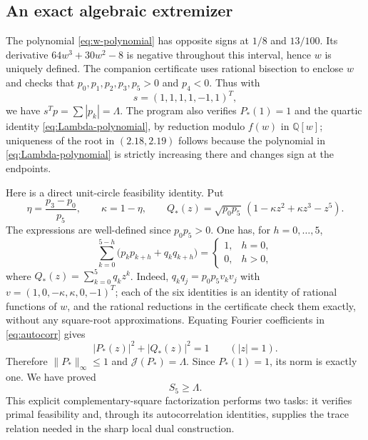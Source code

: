\documentclass[11pt]{article}
\newcommand{\Q}{\mathbb Q}
\newcommand{\J}{\mathcal J}
\begin{document}
\subsection{An exact algebraic extremizer}\label{sec:algebra}

The polynomial \eqref{eq:w-polynomial} has opposite signs at $1/8$ and $13/100$. Its derivative $64w^3+30w^2-8$ is negative throughout this interval, hence $w$ is uniquely defined. The companion certificate uses rational bisection to enclose $w$ and checks that $p_0,p_1,p_2,p_3,p_5>0$ and $p_4<0$. Thus with
\begin{equation}\label{eq:s-vector}
 s=(1,1,1,1,-1,1)^T,
\end{equation}
we have $s^Tp=\sum|p_k|=\Lambda$. The program also verifies $P_*(1)=1$ and the quartic identity \eqref{eq:Lambda-polynomial}, by reduction modulo $f(w)$ in $\Q[w]$; uniqueness of the root in $(2.18,2.19)$ follows because the polynomial in \eqref{eq:Lambda-polynomial} is strictly increasing there and changes sign at the endpoints.

Here is a direct unit-circle feasibility identity. Put
\begin{equation}\label{eq:qcoefficients}
 \eta=\frac{p_3-p_0}{p_5},\qquad \kappa=1-\eta,
 \qquad Q_*(z)=\sqrt{p_0p_5}\,(1-\kappa z^2+\kappa z^3-z^5).
\end{equation}
The expressions are well-defined since $p_0p_5>0$. One has, for $h=0,\ldots,5$,
\begin{equation}\label{eq:autocorr}
 \sum_{k=0}^{5-h}\bigl(p_kp_{k+h}+q_kq_{k+h}\bigr)
 =\begin{cases}1,&h=0,\\0,&h>0,\end{cases}
\end{equation}
where $Q_*(z)=\sum_{k=0}^5q_kz^k$. Indeed, $q_kq_j=p_0p_5v_kv_j$ with $v=(1,0,-\kappa,\kappa,0,-1)^T$; each of the six identities is an identity of rational functions of $w$, and the rational reductions in the certificate check them exactly, without any square-root approximations. Equating Fourier coefficients in \eqref{eq:autocorr} gives
\begin{equation}\label{eq:complement}
 |P_*(z)|^2+|Q_*(z)|^2=1\qquad(|z|=1).
\end{equation}
Therefore $\|P_*\|_\infty\le1$ and $\J(P_*)=\Lambda$. Since $P_*(1)=1$, its norm is exactly one. We have proved
\begin{equation}\label{eq:lowerbound}
 S_5\ge\Lambda.
\end{equation}
This explicit complementary-square factorization performs two tasks: it verifies primal feasibility and, through its autocorrelation identities, supplies the trace relation needed in the sharp local dual construction.
\end{document}
